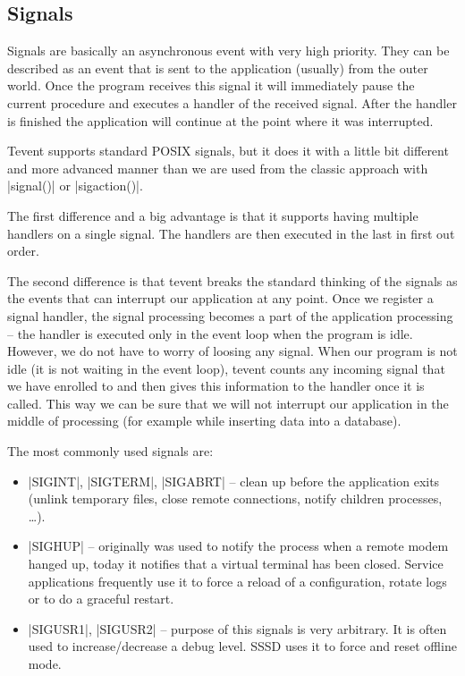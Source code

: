 \subsection{Signals}

Signals are basically an asynchronous event with very high priority. They can be
described as an event that is sent to the application (usually) from the outer
world. Once the program receives this signal it will immediately pause the
current procedure and executes a handler of the received signal. After the
handler is finished the application will continue at the point where it was
interrupted.

Tevent supports standard POSIX signals, but it does it with a little bit
different and more advanced manner than we are used from the classic approach
with |signal()| or |sigaction()|.

The first difference and a big advantage is that it supports having multiple
handlers on a single signal. The handlers are then executed in the last
in first out order.

The second difference is that tevent breaks the standard thinking of the
signals as the events that can interrupt our application at any point. Once we
register a signal handler, the signal processing becomes a part of the
application processing -- the handler is executed only in the event loop when
the program is idle. However, we do not have to worry of loosing any signal.
When our program is not idle (it is not waiting in the event loop), tevent
counts any incoming signal that we have enrolled to and then gives this
information to the handler once it is called. This way we can be sure that we
will not interrupt our application in the middle of processing (for example
while inserting data into a database).

The most commonly used signals are:

\begin{itemize}
  \item |SIGINT|, |SIGTERM|, |SIGABRT| -- clean up before the application exits
  (unlink temporary files, close remote connections, notify children processes,
  \ldots).
  \item |SIGHUP| -- originally was used to notify the process when a remote
  modem hanged up, today it notifies that a virtual terminal has been closed.
  Service applications frequently use it to force a reload of a configuration,
  rotate logs or to do a graceful restart.
  \item |SIGUSR1|, |SIGUSR2| -- purpose of this signals is very arbitrary. It is
  often used to increase/decrease a debug level. SSSD uses it to force and reset
  offline mode.
\end{itemize}

